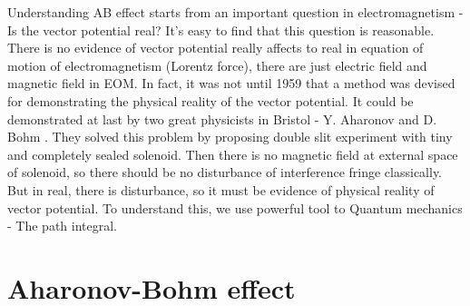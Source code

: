 \documentclass[%
 reprint,
 amsmath,amssymb,
 aps,
]{revtex4-1}
\begin{document}
Understanding AB effect starts from an important question in electromagnetism - Is the vector potential real? It's easy to find that this question is reasonable. There is no evidence of vector potential really affects to real in equation of motion of electromagnetism (Lorentz force), there are just electric field and magnetic field in EOM. In fact, it was not until 1959 that a method was devised for demonstrating the physical reality of the vector potential. It could be demonstrated at last by two great physicists in Bristol - Y. Aharonov and D. Bohm \cite{Aharonov}. They solved this problem by proposing double slit experiment with tiny and completely sealed solenoid. Then there is no magnetic field at external space of solenoid, so there should be no disturbance of interference fringe classically. But in real, there is disturbance, so it must be evidence of physical reality of vector potential. To understand this, we use powerful tool to Quantum mechanics - The path integral.\\

\section{\label{sec:level2}Aharonov-Bohm effect}
\end{document}
